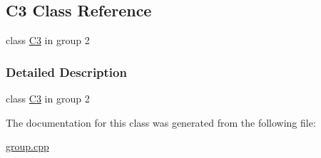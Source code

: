 \hypertarget{class_c3}{}\subsection{C3 Class Reference}
\label{class_c3}


class \hyperlink{class_c3}{C3} in group 2  




\subsubsection{Detailed Description}
class \hyperlink{class_c3}{C3} in group 2 

The documentation for this class was generated from the following file\+:\begin{DoxyCompactItemize}
\item 
\hyperlink{group_8cpp}{group.\+cpp}\end{DoxyCompactItemize}
